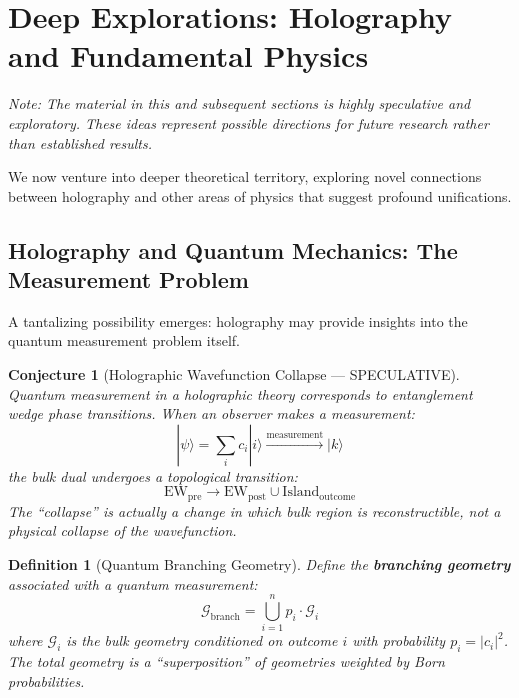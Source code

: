 \documentclass[12pt,a4paper]{article}
\newtheorem{conjecture}[theorem]{Conjecture}
\newtheorem{definition}[theorem]{Definition}
\begin{document}
\section{Deep Explorations: Holography and Fundamental Physics}

\textit{Note: The material in this and subsequent sections is highly speculative and exploratory. These ideas represent possible directions for future research rather than established results.}

We now venture into deeper theoretical territory, exploring novel connections between holography and other areas of physics that suggest profound unifications.

\subsection{Holography and Quantum Mechanics: The Measurement Problem}

A tantalizing possibility emerges: holography may provide insights into the quantum measurement problem itself.

\begin{conjecture}[Holographic Wavefunction Collapse --- SPECULATIVE]
Quantum measurement in a holographic theory corresponds to entanglement wedge phase transitions. When an observer makes a measurement:
\begin{equation}
|\psi\rangle = \sum_i c_i |i\rangle \xrightarrow{\text{measurement}} |k\rangle
\end{equation}
the bulk dual undergoes a topological transition:
\begin{equation}
\text{EW}_{\text{pre}} \to \text{EW}_{\text{post}} \cup \text{Island}_{\text{outcome}}
\end{equation}
The ``collapse'' is actually a change in which bulk region is reconstructible, not a physical collapse of the wavefunction.
\end{conjecture}

\begin{definition}[Quantum Branching Geometry]
Define the \textbf{branching geometry} associated with a quantum measurement:
\begin{equation}
\mathcal{G}_{\text{branch}} = \bigcup_{i=1}^n p_i \cdot \mathcal{G}_i
\end{equation}
where $\mathcal{G}_i$ is the bulk geometry conditioned on outcome $i$ with probability $p_i = |c_i|^2$. The total geometry is a ``superposition'' of geometries weighted by Born probabilities.
\end{definition}
\end{document}
